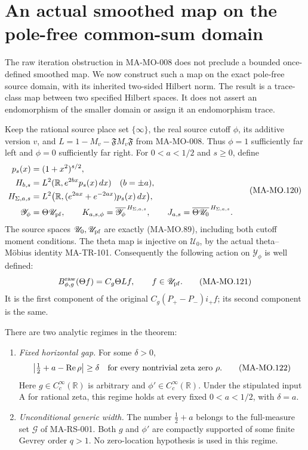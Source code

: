\section{An actual smoothed map on the pole-free common-sum domain}
\label{sec:pole-free-smoothed-transport}

The raw iteration obstruction in MA-MO-008 does not preclude a
bounded once-defined smoothed map. We now construct such a map on
the exact pole-free source domain, with its inherited two-sided
Hilbert norm. The result is a trace-class map between two specified
Hilbert spaces. It does not assert an endomorphism of the smaller
domain or assign it an endomorphism trace.

Keep the rational source place set \(\{\infty\}\), the real source
cutoff \(\phi\), its additive version \(v\), and
\(L=1-M_v-\mathfrak F M_v\mathfrak F\) from MA-MO-008.
Thus \(\phi=1\) sufficiently far left and \(\phi=0\)
sufficiently far right. For \(0<a<1/2\) and \(s\ge0\), define
\[
 \begin{aligned}
 p_s(x)&=(1+x^2)^{s/2},\\
 H_{b,s}&=L^2(\mathbb R,e^{2bx}p_s(x)\,dx)\quad(b=\pm a),\\
 H_{\Sigma,a,s}
   &=L^2\bigl(\mathbb R,(e^{2ax}+e^{-2ax})p_s(x)\,dx\bigr),\\
 \mathscr Y_\phi&=\Theta\mathscr U_{\rm pf},\qquad
 K_{a,s,\phi}=\overline{\mathscr Y_\phi}^{\,H_{\Sigma,a,s}},\qquad
 J_{a,s}=\overline{\Theta\mathscr U_0}^{\,H_{\Sigma,a,s}}.
 \end{aligned}
 \tag{MA-MO.120}
\]
The source spaces \(\mathscr U_0,\mathscr U_{\rm pf}\) are
exactly (MA-MO.89), including both cutoff moment conditions.
The theta map is injective on \(\mathscr U_0\), by the
actual theta--M\"obius identity MA-TR-101. Consequently the
following action on \(\mathscr Y_\phi\) is well defined:
\[
       B_{\phi,g}^{\rm raw}(\Theta f)=C_g\Theta Lf,
                   \qquad f\in\mathscr U_{\rm pf}.
 \tag{MA-MO.121}
\]
It is the first component of the original
\(C_g(P_+-P_-)i_+f\); its second component is the same.

There are two analytic regimes in the theorem:
\begin{enumerate}
\item \emph{Fixed horizontal gap.} For some \(\delta>0\),
\[
 \left|\tfrac12+a-\operatorname{Re}\rho\right|\ge\delta
                  \quad\hbox{for every nontrivial zeta zero }\rho.
 \tag{MA-MO.122}
\]
Here \(g\in C_c^\infty(\mathbb R)\) is arbitrary and
\(\phi'\in C_c^\infty(\mathbb R)\). Under the stipulated
input A for rational zeta, this regime holds at every fixed
\(0<a<1/2\), with \(\delta=a\).
\item \emph{Unconditional generic width.} The number
\(\tfrac12+a\) belongs to the full-measure set
\(\mathscr G\) of MA-RS-001. Both \(g\) and \(\phi'\)
are compactly supported of some finite Gevrey order \(q>1\).
No zero-location hypothesis is used in this regime.
\end{enumerate}

